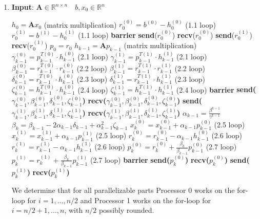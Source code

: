 \documentclass{article}
\begin{document}
\begin{enumerate}[label=(\alph*)]
  \item \textbf{Input}: $ \textbf{A} \in \mathbb{R}^{n\times n} \quad b, x_0\in \mathbb{R}^n$
    \begin{algorithmic}[1]
	\State $h_{0} = \textbf{A}x_{0}$ (matrix multiplication)
	\State $r_0^{(0)} = b^{(0)} - h_0^{(0)}$ (1.1 loop)
	\State $r_0^{(1)} = b^{(1)} - h_0^{(1)}$ (1.1 loop)
	\State \textbf{barrier}
	\State \textbf{send}($r_0^{(0)}$)
	\State \textbf{recv}($r_0^{(0)}$)
	\State \textbf{send}($r_0^{(1)}$)
	\State \textbf{recv}($r_0^{(1)}$)
	\State $p_0 = r_0$
	\State $h_{k-1} = \textbf{A}p_{k-1}$ (matrix multiplication)
	\State $\gamma_{k-1}^{(0)} = p^{T(0)}_{k-1}\cdot h_{k-1}^{(0)}$ (2.1 loop)
	\State $\gamma_{k-1}^{(1)} = p^{T(1)}_{k-1}\cdot h_{k-1}^{(1)}$ (2.1 loop)
	\State $\beta_{k-1}^{(0)} = r^{T(0)}_{k-1}\cdot r_{k-1}^{(0)}$ (2.2 loop)
	\State $\beta_{k-1}^{(1)} = r^{T(1)}_{k-1}\cdot r_{k-1}^{(1)}$ (2.2 loop)
	\State $\delta_{k-1}^{(0)} = r^{T(0)}_{k-1}\cdot h_{k-1}^{(0)}$ (2.3 loop)
	\State $\delta_{k-1}^{(1)} = r^{T(1)}_{k-1}\cdot h_{k-1}^{(1)}$ (2.3 loop)
	\State $\zeta_{k-1}^{(0)} = h^{T(0)}_{k-1}\cdot h_{k-1}^{(0)}$ (2.4 loop)
	\State $\zeta_{k-1}^{(1)} = h^{T(1)}_{k-1}\cdot h_{k-1}^{(1)}$ (2.4 loop)
	\State \textbf{barrier}
      	\State \textbf{send($\gamma_{k-1}^{(0)}, \beta_{k-1}^{(0)}, \delta_{k-1}^{(0)}, \zeta_{k-1}^{(0)}$)}
      	\State \textbf{recv($\gamma_{k-1}^{(0)}, \beta_{k-1}^{(0)}, \delta_{k-1}^{(0)}, \zeta_{k-1}^{(0)}$)}
	\State \textbf{send($\gamma_{k-1}^{(1)}, \beta_{k-1}^{(1)}, \delta_{k-1}^{(1)}, \zeta_{k-1}^{(1)}$)}
      	\State \textbf{recv($\gamma_{k-1}^{(1)}, \beta_{k-1}^{(1)}, \delta_{k-1}^{(1)}, \zeta_{k-1}^{(1)}$)}
	\State $\alpha_{k-1} = \frac{\beta^{k-1}}{\gamma^{k-1}}$
	\State $\beta_{k} = \beta_{k-1} - 2 \alpha_{k-1} \delta_{k-1} + \alpha_{k-1}^2\zeta_{k-1}$
	\State $x_k^{(0)} = x_{k-1}^{(0)} + \alpha_{k-1}p_{k-1}^{(0)}$ (2.5 loop)
	\State $x_k^{(1)} = x_{k-1}^{(1)}  + \alpha_{k-1}p_{k-1}^{(1)} $ (2.5 loop)
	\State $r_k^{(0)} = r_{k-1}^{(0)} - \alpha_{k-1}h_{k-1}^{(0)}$ (2.6 loop)
	\State $r_k^{(1)}  = r_{k-1}^{(1)}  - \alpha_{k-1}h_{k-1}^{(1)} $ (2.6 loop)
	\State $p_k^{(0)} = r_{k}^{(0)} + \frac{\beta_k}{\beta_{k-1}}p_{k-1}^{(0)}$ (2.7 loop)
	\State $p_k^{(1)}  = r_{k}^{(1)}  + \frac{\beta_k}{\beta_{k-1}}p_{k-1}^{(1)} $ (2.7 loop)
	\State \textbf{barrier}
	\State \textbf{send($p_{k}^{(0)} $)}
	\State \textbf{recv($p_{k}^{(0)} $)}
	\State \textbf{send($p_{k}^{(1)} $)}
	\State \textbf{recv($p_{k}^{(1)} $)}  	  	
	\EndFor
    \end{algorithmic}
We determine that for all parallelizable parts Processor 0 works on the for-loop for $i = 1,...,n/2$ and Processor 1 works on the for-loop for $i = n/2+1,...,n$, with $n/2$ possibly rounded.

\end{enumerate}
\end{document}

